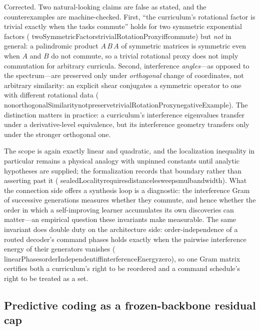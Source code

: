 \documentclass[11pt]{article}
\newcommand{\leanname}[1]{{\scriptsize\ttfamily
  \def\_{\textunderscore\allowbreak}#1}}
\begin{document}
Corrected. Two natural-looking claims are false as stated, and the counterexamples are
machine-checked. First, ``the curriculum's rotational factor is trivial exactly when the
tasks commute'' holds for two symmetric exponential factors
(\leanname{twoSymmetricFactors\_trivialRotationProxy\_iff\_commute}) but \emph{not} in general:
a palindromic product $A\,B\,A$ of symmetric matrices is symmetric even when $A$ and $B$ do
not commute, so a trivial rotational proxy does not imply commutation for arbitrary
curricula. Second, interference \emph{angles}---as opposed to the spectrum---are preserved
only under \emph{orthogonal} change of coordinates, not arbitrary similarity: an explicit
shear conjugates a symmetric operator to one with different rotational data
(\leanname{nonorthogonalSimilarity\_not\_preserve\_trivialRotationProxy\_negativeExample}). The
distinction matters in practice: a curriculum's interference eigenvalues transfer under a
derivative-level equivalence, but its interference geometry transfers only under the
stronger orthogonal one.

The scope is again exactly linear and quadratic, and the localization inequality in
particular remains a physical analogy with unpinned constants until analytic hypotheses are
supplied; the formalization records that boundary rather than asserting past it
(\leanname{sealedLocality\_requires\_distance\_le\_sweeps\_mul\_bandwidth}). What the connection
side offers a synthesis loop is a diagnostic: the interference Gram of successive
generations measures whether they commute, and hence whether the order in which a
self-improving learner accumulates its own discoveries can matter---an empirical question
these invariants make measurable. The same invariant does double duty on the architecture
side: order-independence of a routed decoder's command phases holds exactly when the
pairwise interference energy of their generators vanishes
(\leanname{linearPhases\_orderIndependent\_iff\_interferenceEnergy\_zero}), so one Gram
matrix certifies both a curriculum's right to be reordered and a command schedule's right
to be treated as a set.

\subsection{Predictive coding as a frozen-backbone residual cap}
\label{sec:pc-adapter}
\end{document}

